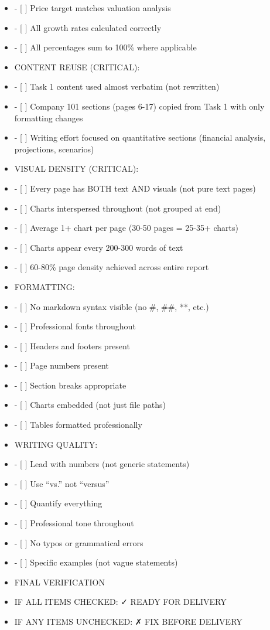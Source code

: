 \documentclass[11pt]{article}
\begin{document}
\begin{itemize}[leftmargin=*,itemsep=2pt,topsep=2pt]
\item {} - [ ] Price target matches valuation analysis
\item {} - [ ] All growth rates calculated correctly
\item {} - [ ] All percentages sum to 100\% where applicable
\item {} CONTENT REUSE (CRITICAL):
\item {} - [ ] Task 1 content used almost verbatim (not rewritten)
\item {} - [ ] Company 101 sections (pages 6-17) copied from Task 1 with only formatting changes
\item {} - [ ] Writing effort focused on quantitative sections (financial analysis, projections, scenarios)
\item {} VISUAL DENSITY (CRITICAL):
\item {} - [ ] Every page has BOTH text AND visuals (not pure text pages)
\item {} - [ ] Charts interspersed throughout (not grouped at end)
\item {} - [ ] Average 1+ chart per page (30-50 pages = 25-35+ charts)
\item {} - [ ] Charts appear every 200-300 words of text
\item {} - [ ] 60-80\% page density achieved across entire report
\item {} FORMATTING:
\item {} - [ ] No markdown syntax visible (no \#, \#\#, **, etc.)
\item {} - [ ] Professional fonts throughout
\item {} - [ ] Headers and footers present
\item {} - [ ] Page numbers present
\item {} - [ ] Section breaks appropriate
\item {} - [ ] Charts embedded (not just file paths)
\item {} - [ ] Tables formatted professionally
\item {} WRITING QUALITY:
\item {} - [ ] Lead with numbers (not generic statements)
\item {} - [ ] Use ``vs.'' not ``versus''
\item {} - [ ] Quantify everything
\item {} - [ ] Professional tone throughout
\item {} - [ ] No typos or grammatical errors
\item {} - [ ] Specific examples (not vague statements)
\item {} FINAL VERIFICATION
\item {} IF ALL ITEMS CHECKED: ✓ READY FOR DELIVERY
\item {} IF ANY ITEMS UNCHECKED: ✗ FIX BEFORE DELIVERY
\end{itemize}
\end{document}

